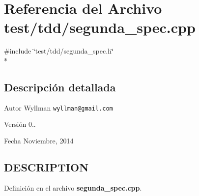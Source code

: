 \section{Referencia del Archivo test/tdd/segunda\+\_\+spec.cpp}
\label{segunda__spec_8cpp}
{\ttfamily \#include \char`\"{}test/tdd/segunda\+\_\+spec.\+h\char`\"{}}\\*


\subsection{Descripción detallada}
\begin{DoxyAuthor}{Autor}
Wyllman {\tt wyllman@gmail.\+com} 
\end{DoxyAuthor}
\begin{DoxyVersion}{Versión}
0.. 
\end{DoxyVersion}
\begin{DoxyDate}{Fecha}
Noviembre, 2014 
\end{DoxyDate}
\subsection{D\+E\+S\+C\+R\+I\+P\+T\+I\+O\+N}\label{main_8cpp_DESCRIPTION}


Definición en el archivo {\bf segunda\+\_\+spec.\+cpp}.

